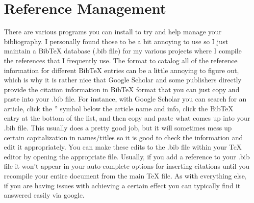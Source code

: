 \section{Reference Management}
\label{sec:reference-management}
There are various programs you can install to try and help manage your bibliography. I personally found those to be a bit annoying to use so I just maintain a BibTeX database (.bib file) for my various projects where I compile the references that I frequently use. The format to catalog all of the reference information for different BibTeX entries can be a little annoying to figure out, which is why it is rather nice that Google Scholar and some publishers directly provide the citation information in BibTeX format that you can just copy and paste into your .bib file. For instance, with Google Scholar you can search for an article, click the '' symbol below the article name and info, click the BibTeX entry at the bottom of the list, and then copy and paste what comes up into your .bib file. This usually does a pretty good job, but it will sometimes mess up certain capitalization in names/titles so it is good to check the information and edit it appropriately. You can make these edits to the .bib file within your TeX editor by opening the appropriate file. Usually, if you add a reference to your .bib file it won't appear in your auto-complete options for inserting citations until you recompile your entire document from the main TeX file. As with everything else, if you are having issues with achieving a certain effect you can typically find it answered easily via google.